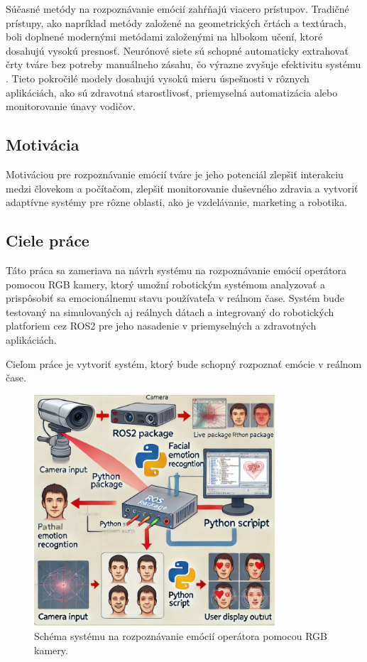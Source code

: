 Súčasné metódy na rozpoznávanie emócií zahŕňajú viacero prístupov. Tradičné prístupy, ako napríklad metódy založené na geometrických črtách a textúrach, boli doplnené modernými metódami založenými 
na hlbokom učení, ktoré dosahujú vysokú presnosť. Neurónové siete sú schopné automaticky extrahovať črty tváre bez potreby manuálneho zásahu, čo výrazne zvyšuje efektivitu systému​. Tieto pokročilé 
modely dosahujú vysokú mieru úspešnosti v rôznych aplikáciách, ako sú zdravotná starostlivosť, priemyselná automatizácia alebo monitorovanie únavy vodičov​. \cite{article03} \cite{book01}

\subsection{Motivácia}
Motiváciou pre rozpoznávanie emócií tváre je jeho potenciál zlepšiť interakciu medzi človekom a počítačom, zlepšiť monitorovanie duševného zdravia a vytvoriť adaptívne systémy pre rôzne oblasti, 
ako je vzdelávanie, marketing a robotika. \cite{article01}
\subsection{Ciele práce}
Táto práca sa zameriava na návrh systému na rozpoznávanie emócií operátora pomocou RGB kamery, ktorý umožní robotickým systémom analyzovať a prispôsobiť sa emocionálnemu stavu používateľa v reálnom čase. 
Systém bude testovaný na simulovaných aj reálnych dátach a integrovaný do robotických platforiem cez ROS2 pre jeho nasadenie v priemyselných a zdravotných aplikáciách.

Cieľom práce je vytvoriť systém, ktorý bude schopný rozpoznať emócie v reálnom čase.
\begin{figure}[!htpb]
    \centering
    \includegraphics[width=0.8\textwidth]{img/connection.png}
    \caption{Schéma systému na rozpoznávanie emócií operátora pomocou RGB kamery.} 
    \label{fig:schema}
\end{figure}
